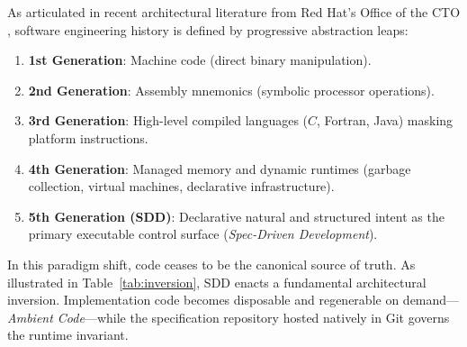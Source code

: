 \documentclass[11pt,a4paper]{article}
\begin{document}
As articulated in recent architectural literature from Red Hat's Office of the CTO \cite{griffin2026spec}, software engineering history is defined by progressive abstraction leaps:
\begin{enumerate}
    \item \textbf{1st Generation}: Machine code (direct binary manipulation).
    \item \textbf{2nd Generation}: Assembly mnemonics (symbolic processor operations).
    \item \textbf{3rd Generation}: High-level compiled languages ($C$, Fortran, Java) masking platform instructions.
    \item \textbf{4th Generation}: Managed memory and dynamic runtimes (garbage collection, virtual machines, declarative infrastructure).
    \item \textbf{5th Generation (SDD)}: Declarative natural and structured intent as the primary executable control surface (\textit{Spec-Driven Development}).
\end{enumerate}

In this paradigm shift, code ceases to be the canonical source of truth. As illustrated in Table~\ref{tab:inversion}, SDD enacts a fundamental architectural inversion. Implementation code becomes disposable and regenerable on demand---\textit{Ambient Code}---while the specification repository hosted natively in Git governs the runtime invariant.

\begin{table}[h!]
\centering
\small
\caption{Architectural Inversion: Classical vs. Open-SDD Model (adapted from \cite{griffin2026spec}).}
\label{tab:inversion}
\end{table}
\end{document}

